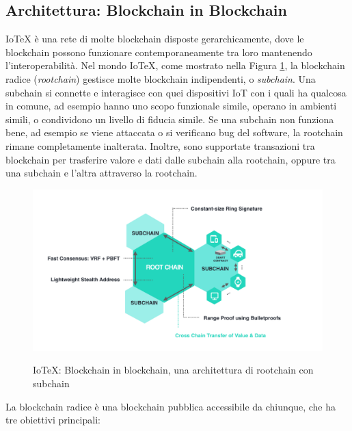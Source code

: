 \documentclass[a4paper,12pt]{article}
\begin{document}
\subsection{Architettura: Blockchain in Blockchain}
IoTeX è una rete di molte blockchain disposte gerarchicamente, dove le blockchain possono funzionare contemporaneamente tra loro mantenendo l'interoperabilità. Nel mondo IoTeX, come mostrato nella Figura \ref{fig:fig1}, la blockchain radice (\emph{rootchain}) gestisce molte blockchain indipendenti, o \emph{subchain}. Una subchain si connette e interagisce con quei dispositivi IoT con i quali ha qualcosa in comune, ad esempio hanno uno scopo funzionale simile, operano in
ambienti simili, o condividono un livello di fiducia simile. Se una subchain non funziona bene, ad esempio se viene attaccata o si verificano bug del software, la rootchain rimane completamente inalterata. Inoltre, sono supportate transazioni tra blockchain per trasferire valore e dati dalle subchain alla rootchain, oppure tra una subchain e l'altra attraverso la rootchain.

\begin{figure}[ht]
	\includegraphics[width=\textwidth]{Figura1.png}
	\label{fig:fig1}
	\caption{IoTeX: Blockchain in blockchain, una architettura di rootchain con subchain}
\end{figure}

La blockchain radice è una blockchain pubblica accessibile da chiunque, che ha tre obiettivi principali:
\end{document}
